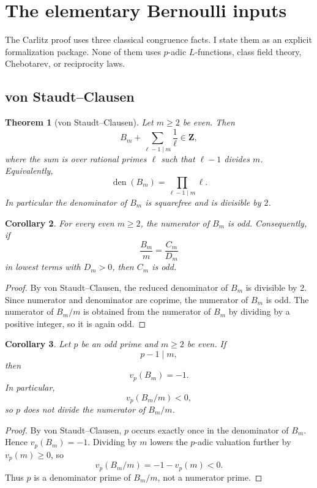 \documentclass[11pt]{article}
\newtheorem{theorem}{Theorem}[section]
\newtheorem{corollary}[theorem]{Corollary}
\newcommand{\Z}{\mathbf Z}
\newcommand{\den}{\operatorname{den}}
\begin{document}
\section{The elementary Bernoulli inputs}

The Carlitz proof uses three classical congruence facts.  I state them as an explicit formalization package.  None of them uses $p$-adic $L$-functions, class field theory, Chebotarev, or reciprocity laws.

\subsection{von Staudt--Clausen}

\begin{theorem}[von Staudt--Clausen]
Let $m\ge 2$ be even.  Then
\[
  B_m+\sum_{\ell-1\mid m}\frac{1}{\ell}\in \Z,
\]
where the sum is over rational primes $\ell$ such that $\ell-1$ divides $m$.
Equivalently,
\[
  \den(B_m)=\prod_{\ell-1\mid m}\ell.
\]
In particular the denominator of $B_m$ is squarefree and is divisible by $2$.
\end{theorem}

\begin{corollary}\label{cor:numerator_odd}
For every even $m\ge 2$, the numerator of $B_m$ is odd.  Consequently, if
\[
  \frac{B_m}{m}=\frac{C_m}{D_m}
\]
in lowest terms with $D_m>0$, then $C_m$ is odd.
\end{corollary}

\begin{proof}
By von Staudt--Clausen, the reduced denominator of $B_m$ is divisible by $2$.  Since numerator and denominator are coprime, the numerator of $B_m$ is odd.  The numerator of $B_m/m$ is obtained from the numerator of $B_m$ by dividing by a positive integer, so it is again odd.
\end{proof}

\begin{corollary}\label{cor:p_denom_when_p_minus_one_divides}
Let $p$ be an odd prime and $m\ge 2$ be even.  If
\[
  p-1\mid m,
\]
then
\[
  v_p(B_m)=-1.
\]
In particular,
\[
  v_p(B_m/m)<0,
\]
so $p$ does not divide the numerator of $B_m/m$.
\end{corollary}

\begin{proof}
By von Staudt--Clausen, $p$ occurs exactly once in the denominator of $B_m$.  Hence $v_p(B_m)=-1$.  Dividing by $m$ lowers the $p$-adic valuation further by $v_p(m)\ge 0$, so
\[
  v_p(B_m/m)=-1-v_p(m)<0.
\]
Thus $p$ is a denominator prime of $B_m/m$, not a numerator prime.
\end{proof}
\end{document}
